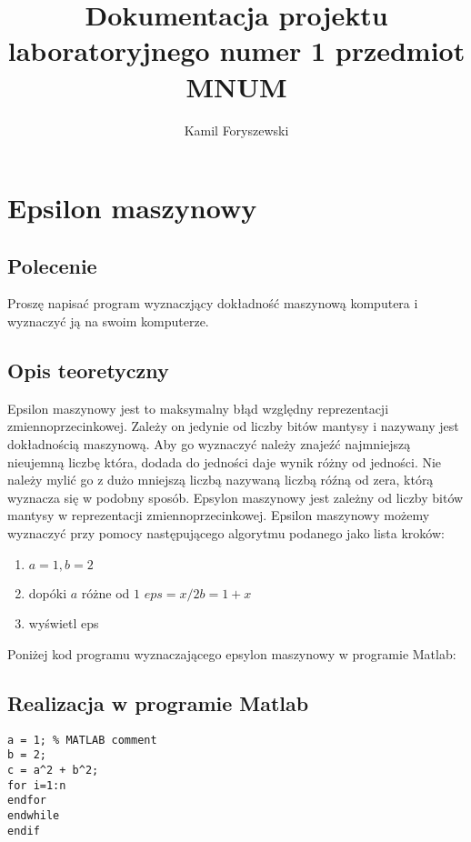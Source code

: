 \documentclass[a4paper, 8pt]{article}
\author{Kamil Foryszewski}
\title{Dokumentacja projektu laboratoryjnego numer 1 przedmiot MNUM}
\begin{document}

\maketitle
\tableofcontents


\section{Epsilon maszynowy}
\subsection*{Polecenie}
Proszę napisać program wyznaczjący dokładność maszynową komputera i wyznaczyć ją na swoim komputerze.
\subsection*{Opis teoretyczny}
\indent

Epsilon maszynowy jest to maksymalny błąd względny reprezentacji zmiennoprzecinkowej. Zależy on jedynie od liczby bitów mantysy i nazywany jest dokładnością maszynową. Aby go wyznaczyć należy znajeźć najmniejszą nieujemną liczbę która, dodada do jedności daje wynik różny od jedności. Nie należy mylić go z dużo mniejszą liczbą nazywaną liczbą róźną od zera, którą wyznacza się w podobny sposób. Epsylon maszynowy jest zależny od liczby bitów mantysy w reprezentacji zmiennoprzecinkowej. Epsilon maszynowy możemy wyznaczyć przy pomocy następującego algorytmu podanego jako lista kroków:
\begin{enumerate}
  \item $a = 1, b = 2$
  \item dopóki $a$ różne od $1$ $eps = x/2 b = 1 + x$
  \item wyświetl eps
\end{enumerate} 
Poniżej kod programu wyznaczającego epsylon maszynowy w programie Matlab:


\subsection*{Realizacja w programie Matlab}

\begin{lstlisting}
a = 1; % MATLAB comment 
b = 2; 
c = a^2 + b^2;
for i=1:n
endfor
endwhile
endif
\end{lstlisting}






	
\end{document}
